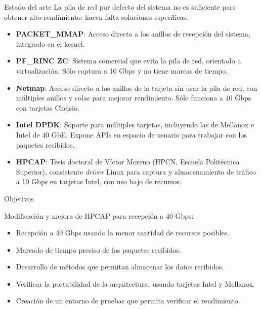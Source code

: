 \documentclass[10pt,notes,compress,usetitleprogressbar,aspectratio=1610]{beamer}
\begin{document}
\begin{frame}{Estado del arte}
La pila de red por defecto del sistema no es suficiente para obtener alto rendimiento: hacen falta soluciones específicas.

\begin{itemize}
\item \textbf{PACKET\_MMAP}: Acceso directo a los anillos de recepción del sistema, integrado en el kernel. 
\item \textbf{PF\_RINC ZC}: Sistema comercial que evita la pila de red, orientado a virtualización. Sólo captura a 10 Gbps y no tiene marcas de tiempo.
\item \textbf{Netmap}: Acceso directo a los anillos de la tarjeta sin usar la pila de red, con múltiples anillos y colas para mejorar rendimiento. Sólo funciona a 40 Gbps con tarjetas Chelsio.
\item \textbf{Intel DPDK}: Soporte para múltiples tarjetas, incluyendo las de Mellanox e Intel de 40 GbE. Expone APIs en espacio de usuario para trabajar con los paquetes recibidos. 
\item \textbf{HPCAP}: Tesis doctoral de Víctor Moreno (HPCN, Escuela Politécnica Superior), consistente \textit{driver} Linux para captura y almacenamiento de tráfico a 10 Gbps en tarjetas Intel, con uso bajo de recursos.
\end{itemize}
\end{frame}

\begin{frame}{Objetivos}

Modificación y mejora de HPCAP para recepción a 40 Gbps:

\begin{itemize}
\item Recepción a 40 Gbps usando la menor cantidad de recursos posibles.
\item Marcado de tiempo preciso de los paquetes recibidos.
\item Desarrollo de métodos que permitan almacenar los datos recibidos.
\item Verificar la portabilidad de la arquitectura, usando tarjetas Intel y Mellanox.
\item Creación de un entorno de pruebas que permita verificar el rendimiento.
\end{itemize}

\end{frame}
\end{document}
